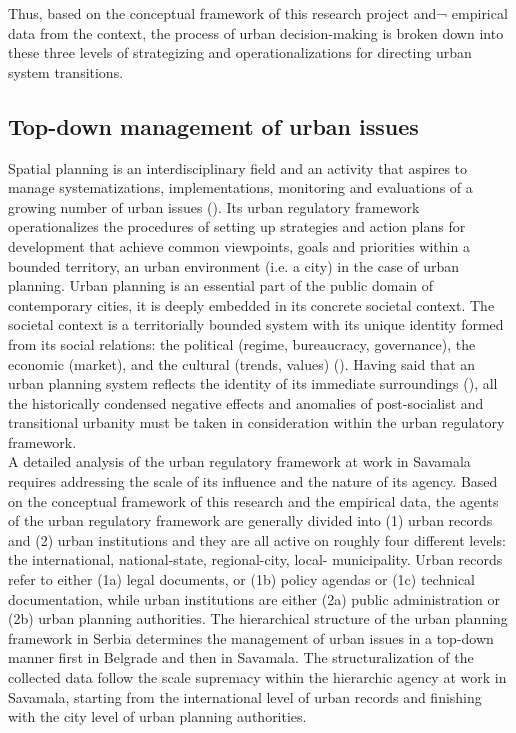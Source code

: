 \documentclass[11pt]{report}
\begin{document}
{{{{Thus, based on the conceptual framework of this research project and¬ empirical data from the context, the process of urban decision-making is broken down into these three levels of strategizing and operationalizations for directing urban system transitions. 

\subsection{Top-down management of urban issues}

Spatial planning is an interdisciplinary field and an activity that aspires to manage systematizations, implementations, monitoring and evaluations of a growing number of urban issues (\href{Fisher}{\citealt{fisher_building_2001}}). Its urban regulatory framework operationalizes the procedures of setting up strategies and action plans for development that achieve common viewpoints, goals and priorities within a bounded territory, an urban environment (i.e. a city) in the case of urban planning.
Urban planning is an essential part of the public domain of contemporary cities, it is deeply embedded in its concrete societal context. The societal context is a territorially bounded system with its unique identity formed from its social relations: the political (regime, bureaucracy, governance), the economic (market), and the cultural  (trends, values)  (\href{Vujosevic}{\citealt{vujosevic_planning_2006}}).
Having said that an urban planning system reflects the identity of its immediate surroundings (\href{Stojkov}{\citealt{stojkov_prostorno_2012}}),
all the historically condensed negative effects and anomalies of post-socialist and transitional urbanity must be taken in consideration within the urban regulatory framework.
\\

A detailed analysis of the urban regulatory framework at work in Savamala requires addressing the scale of its influence and the nature of its agency. Based on the conceptual framework of this research and the empirical data, the agents of the urban regulatory framework are generally divided into (1) urban records and (2) urban institutions and they are all active on roughly four different levels: the international, national-state, regional-city, local- municipality. Urban records refer to either (1a) legal documents, or (1b) policy agendas or (1c) technical documentation, while urban institutions are either (2a) public administration or (2b) urban planning authorities. The hierarchical structure of the urban planning framework in Serbia determines the management of urban issues in a top-down manner first in Belgrade and then in Savamala. The structuralization of the collected data follow the scale supremacy within the hierarchic agency at work in Savamala, starting from the international level of urban records and finishing with the city level of urban planning authorities.
\\

}}}}
\end{document}
